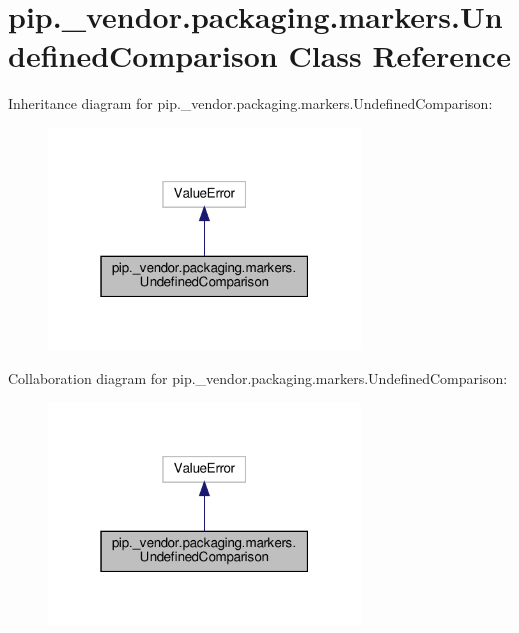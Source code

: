 \hypertarget{classpip_1_1__vendor_1_1packaging_1_1markers_1_1UndefinedComparison}{}\section{pip.\+\_\+vendor.\+packaging.\+markers.\+Undefined\+Comparison Class Reference}
\label{classpip_1_1__vendor_1_1packaging_1_1markers_1_1UndefinedComparison}


Inheritance diagram for pip.\+\_\+vendor.\+packaging.\+markers.\+Undefined\+Comparison\+:
\nopagebreak
\begin{figure}[H]
\begin{center}
\leavevmode
\includegraphics[width=235pt]{classpip_1_1__vendor_1_1packaging_1_1markers_1_1UndefinedComparison__inherit__graph}
\end{center}
\end{figure}


Collaboration diagram for pip.\+\_\+vendor.\+packaging.\+markers.\+Undefined\+Comparison\+:
\nopagebreak
\begin{figure}[H]
\begin{center}
\leavevmode
\includegraphics[width=235pt]{classpip_1_1__vendor_1_1packaging_1_1markers_1_1UndefinedComparison__coll__graph}
\end{center}
\end{figure}


